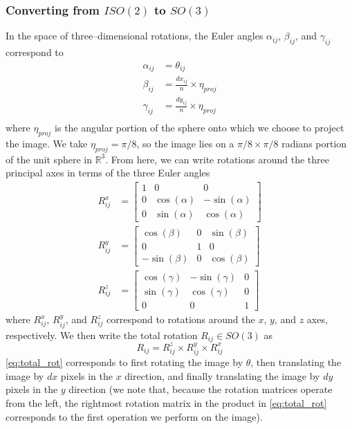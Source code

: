 \documentclass[11pt]{article}
\begin{document}
\subsubsection{Converting from $ISO(2)$ to $SO(3)$}

In the space of three--dimensional rotations, the Euler angles $\alpha_{ij}$, $\beta_{ij}$, and $\gamma_{ij}$ correspond to
\begin{equation} \label{eq:angle_relations}
\begin{aligned}
	\alpha_{ij} &= \theta_{ij} \\
	\beta_{ij} &= \frac{dx_{ij}}{n} \times \eta_{proj} \\
	\gamma_{ij} &= \frac{dy_{ij}}{n} \times \eta_{proj} \\
\end{aligned}
\end{equation}
where $\eta_{proj}$ is the angular portion of the sphere onto which we choose to project the image.
%
We take $\eta_{proj} =  \pi/8$, so the image lies on a $\pi/8 \times \pi/8$ radians portion of the unit sphere in $\mathbb{R}^3$.
%
From here, we can write rotations around the three principal axes in terms of the three Euler angles
\begin{equation}
\begin{aligned}
	R^x_{ij} &= \begin{bmatrix}
	1 & 0 & 0 \\
    0 & \cos(\alpha) & -\sin(\alpha) \\
    0 & \sin(\alpha) & \cos(\alpha)
	\end{bmatrix} \\
	R^y_{ij} &= \begin{bmatrix}
	\cos(\beta) & 0 & \sin(\beta) \\
    0 & 1 & 0 \\
    -\sin(\beta) & 0 & \cos(\beta)
    \end{bmatrix} \\
	R^z_{ij} &= \begin{bmatrix} 
	\cos(\gamma) & -\sin(\gamma) & 0 \\
    \sin(\gamma) & \cos(\gamma) & 0 \\
    0 & 0 & 1 
    \end{bmatrix}
\end{aligned}
\end{equation}
where $R^x_{ij}$, $R^y_{ij}$, and $R^z_{ij}$ correspond to rotations around the $x$, $y$, and $z$ axes, respectively.
%
We then write the total rotation $R_{ij} \in SO(3)$ as 
\begin{equation} \label{eq:total_rot}
	R_{ij}	 = R^z_{ij} \times R^y_{ij} \times R^x_{ij}
\end{equation}
%
\eqref{eq:total_rot} corresponds to first rotating the image by $\theta$, then translating the image by $dx$ pixels in the $x$ direction, and finally translating the image by $dy$ pixels in the $y$ direction (we note that, because the rotation matrices operate from the left, the rightmost rotation matrix in the product in \eqref{eq:total_rot} corresponds to the first operation we perform on the image).
\end{document}
